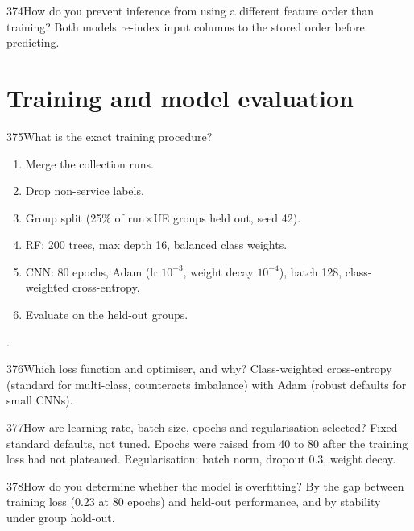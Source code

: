 \begin{qa}{374}{How do you prevent inference from using a different feature order than training?}
Both models re-index input columns to the stored order before predicting.
\end{qa}

\section{Training and model evaluation}

\begin{qa}{375}{What is the exact training procedure?}
\begin{enumerate}
\item Merge the collection runs.
\item Drop non-service labels.
\item Group split (25\% of run$\times$UE groups held out, seed 42).
\item RF: 200 trees, max depth 16, balanced class weights.
\item CNN: 80 epochs, Adam (lr $10^{-3}$, weight decay $10^{-4}$), batch 128, class-weighted cross-entropy.
\item Evaluate on the held-out groups.
\end{enumerate}
.
\end{qa}

\begin{qa}{376}{Which loss function and optimiser, and why?}
Class-weighted cross-entropy (standard for multi-class, counteracts imbalance) with Adam (robust defaults for small
CNNs).
\end{qa}

\begin{qa}{377}{How are learning rate, batch size, epochs and regularisation selected?}
Fixed standard defaults, not tuned. Epochs were raised from 40 to 80 after the training loss had not plateaued.
Regularisation: batch norm, dropout 0.3, weight decay.
\end{qa}

\begin{qa}{378}{How do you determine whether the model is overfitting?}
By the gap between training loss (0.23 at 80 epochs) and held-out performance, and by stability under group hold-out.
\end{qa}

